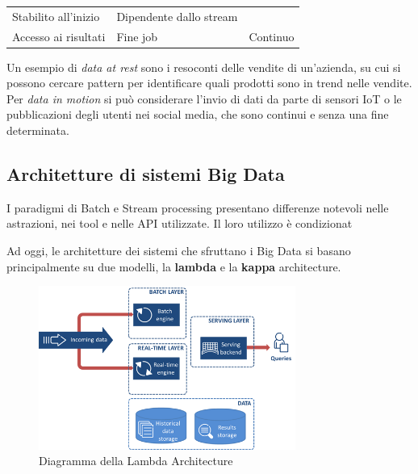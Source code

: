 \documentclass[italian,a4paper, twoside, 12pt]{report}
\begin{document}
\begin{longtable}[]{@{}lll@{}}
\begin{minipage}[t]{0.21\columnwidth}
Stabilito all'inizio\strut
\end{minipage} & \begin{minipage}[t]{0.43\columnwidth}\raggedright\strut
Dipendente dallo stream\strut
\end{minipage}\tabularnewline
\begin{minipage}[t]{0.27\columnwidth}\raggedright\strut
Accesso ai risultati\strut
\end{minipage} & \begin{minipage}[t]{0.21\columnwidth}\raggedright\strut
Fine job\strut
\end{minipage} & \begin{minipage}[t]{0.43\columnwidth}\raggedright\strut
Continuo\strut
\end{minipage}\tabularnewline
\bottomrule
\end{longtable}

Un esempio di \emph{data at rest} sono i resoconti delle vendite di
un'azienda, su cui si possono cercare pattern per identificare quali
prodotti sono in trend nelle vendite. Per \emph{data in motion} si può
considerare l'invio di dati da parte di sensori IoT o le pubblicazioni
degli utenti nei social media, che sono continui e senza una fine
determinata.

\subsection{Architetture di sistemi Big
Data}\label{architetture-di-sistemi-big-data}

I paradigmi di Batch e Stream processing presentano differenze notevoli
nelle astrazioni, nei tool e nelle API utilizzate. Il loro utilizzo è
condizionat

Ad oggi, le architetture dei sistemi che sfruttano i Big Data si basano
principalmente su due modelli, la \textbf{lambda} e la \textbf{kappa}
architecture.

\begin{figure}
\centering
\includegraphics[width=0.75000\textwidth]{img/lambda_architecture.png}
\caption{Diagramma della Lambda Architecture}
\end{figure}
\end{document}
